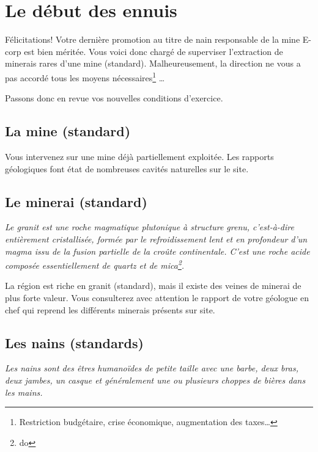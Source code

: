 
\newpage

\section{Le début des ennuis}

  Félicitations! Votre dernière promotion au titre de nain responsable de la
  mine E-corp est bien méritée. Vous voici donc chargé de superviser
  l'extraction de minerais rares d'une mine (standard). Malheureusement, la
  direction ne vous a pas accordé tous les moyens nécessaires\footnote{
  Restriction budgétaire, crise économique, augmentation des taxes\ldots{}}
  \ldots{}

  Passons donc en revue vos nouvelles conditions d'exercice.

\subsection{La mine (standard)}

  Vous intervenez sur une mine déjà partiellement exploitée. Les rapports
  géologiques font état de nombreuses cavités naturelles sur le site.

\subsection{Le minerai (standard)}

  \textit{Le granit est une roche magmatique plutonique à structure grenu,
  c'est-à-dire entièrement cristallisée, formée par le refroidissement lent et
  en profondeur d'un magma issu de la fusion partielle de la croûte
  continentale.  C'est une roche acide composée essentiellement de quartz et de
  mica\footnote{do}.}

  La région est riche en granit (standard), mais il existe des veines de
  minerai de plus forte valeur. Vous consulterez avec attention le rapport de
  votre géologue en chef qui reprend les différents minerais présents sur site.

\subsection{Les nains (standards)}

  \textit{Les nains sont des êtres humanoïdes de petite taille avec une barbe,
  deux bras, deux jambes, un casque et généralement une ou plusieurs choppes de
  bières dans les mains.}


